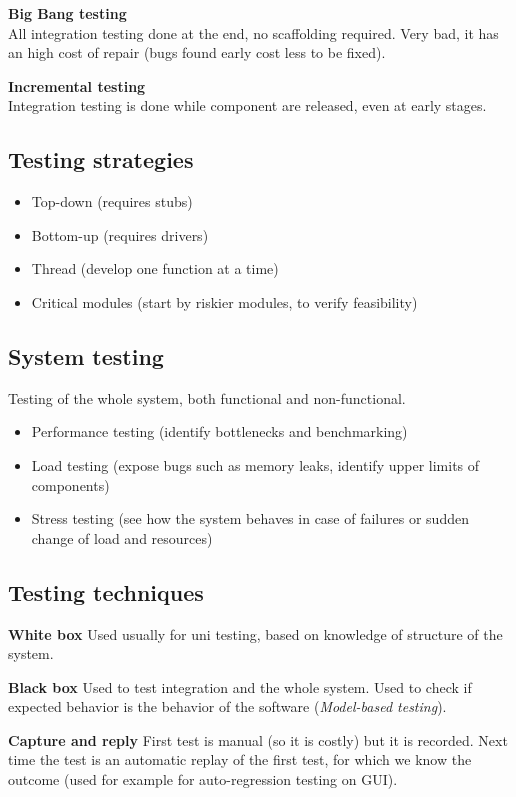 \textbf{Big Bang testing}\\
All integration testing done at the end, no scaffolding required.
Very bad, it has an high cost of repair (bugs found early cost less to be fixed).

\textbf{Incremental testing}\\
Integration testing is done while component are released, even at early stages.

\subsection{Testing strategies}
\begin{itemize}
    \item Top-down (requires stubs)
    \item Bottom-up (requires drivers)
    \item Thread (develop one function at a time)
    \item Critical modules (start by riskier modules, to verify feasibility)
\end{itemize}

\subsection{System testing}
Testing of the whole system, both functional and non-functional.
\begin{itemize}
    \item Performance testing (identify bottlenecks and benchmarking)
    \item Load testing (expose bugs such as memory leaks, identify upper limits of components)
    \item Stress testing (see how the system behaves in case of failures or sudden change of load and resources)
\end{itemize}

\subsection{Testing techniques}
\textbf{White box} Used usually for uni testing, based on knowledge of structure of the system.

\textbf{Black box} Used to test integration and the whole system. Used to check if expected behavior is the behavior of the software (\emph{Model-based testing}).

\textbf{Capture and reply} First test is manual (so it is costly) but it is recorded. Next time the test is an automatic replay of the first test, for which we know the outcome (used for example for auto-regression testing on GUI).